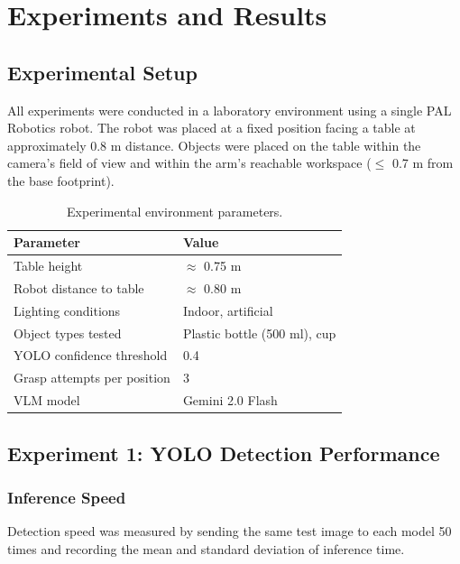 \chapter{Experiments and Results}
\label{ch:experiments}

\section{Experimental Setup}

All experiments were conducted in a laboratory environment using a single PAL Robotics
\tiago{} robot.
The robot was placed at a fixed position facing a table at approximately 0.8 m distance.
Objects were placed on the table within the camera's field of view and within the
arm's reachable workspace ($\leq$ 0.7 m from the base footprint).

\begin{table}[H]
\centering
\caption{Experimental environment parameters.}
\label{tab:exp_setup}
\begin{tabular}{ll}
\toprule
\textbf{Parameter} & \textbf{Value} \\
\midrule
Table height               & $\approx$ 0.75 m \\
Robot distance to table    & $\approx$ 0.80 m \\
Lighting conditions        & Indoor, artificial \\
Object types tested        & Plastic bottle (500 ml), cup \\
YOLO confidence threshold  & 0.4 \\
Grasp attempts per position& 3 \\
VLM model                  & Gemini 2.0 Flash \\
\bottomrule
\end{tabular}
\end{table}

\section{Experiment 1: YOLO Detection Performance}

\subsection{Inference Speed}

Detection speed was measured by sending the same test image to each model
50 times and recording the mean and standard deviation of inference time.

